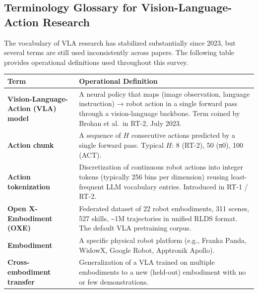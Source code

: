 \subsection{Terminology Glossary for Vision-Language-Action Research}\label{terminology-glossary-for-vision-language-action-research}

The vocabulary of VLA research has stabilized substantially since 2023, but several terms are still used inconsistently across papers. The following table provides operational definitions used throughout this survey.

{\def\LTcaptype{none} %
\begin{longtable}[]{@{}
  >{\raggedright\arraybackslash}p{}
  >{\raggedright\arraybackslash}p{}@{}}
\toprule\noalign{}
\begin{minipage}[b]{\linewidth}\raggedright
Term
\end{minipage} & \begin{minipage}[b]{\linewidth}\raggedright
Operational Definition
\end{minipage} \\
\midrule\noalign{}
\endhead
\bottomrule\noalign{}
\endlastfoot
\textbf{Vision-Language-Action (VLA) model} & A neural policy that maps (image observation, language instruction) → robot action in a single forward pass through a vision-language backbone. Term coined by Brohan et al.~in RT-2, July 2023. \\
\textbf{Action chunk} & A sequence of \(H\) consecutive actions predicted by a single forward pass. Typical \(H\): 8 (RT-2), 50 (π0), 100 (ACT). \\
\textbf{Action tokenization} & Discretization of continuous robot actions into integer tokens (typically 256 bins per dimension) reusing least-frequent LLM vocabulary entries. Introduced in RT-1 / RT-2. \\
\textbf{Open X-Embodiment (OXE)} & Federated dataset of 22 robot embodiments, 311 scenes, 527 skills, \textasciitilde1M trajectories in unified RLDS format. The default VLA pretraining corpus. \\
\textbf{Embodiment} & A specific physical robot platform (e.g., Franka Panda, WidowX, Google Robot, Apptronik Apollo). \\
\textbf{Cross-embodiment transfer} & Generalization of a VLA trained on multiple embodiments to a new (held-out) embodiment with no or few demonstrations. \\

\end{longtable}}
